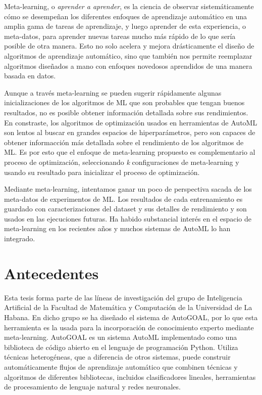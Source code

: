 Meta-learning, o \textit{aprender a aprender}, es la ciencia de observar sistemáticamente cómo se desempeñan los diferentes enfoques de aprendizaje automático en una amplia gama de tareas de aprendizaje, y luego aprender de esta experiencia, o meta-datos, para aprender nuevas tareas mucho más rápido de lo que sería posible de otra manera. Esto no solo acelera y mejora drásticamente el diseño de algoritmos de aprendizaje automático, sino que también nos permite reemplazar algoritmos diseñados a mano con enfoques novedosos aprendidos de una manera basada en datos.

Aunque a través meta-learning se pueden sugerir rápidamente algunas inicializaciones de los algoritmos de ML que son probables que tengan buenos resultados, no es posible obtener información detallada sobre sus rendimientos. En constraste, los algoritmos de optimización usados en herramientas de AutoML son lentos al buscar en grandes espacios de hiperparámetros, pero son capaces de obtener informacción más detallada sobre el rendimiento de los algoritmos de ML. Es por esto que el enfoque de meta-learning propuesto es complementario al proceso de optimización, seleccionando \textit{k} configuraciones de meta-learning y usando su resultado para inicializar el proceso de optimización.

Mediante meta-learning, intentamos ganar un poco de perspectiva sacada de los meta-datos de experimentos de ML. Los resultados de cada entrenamiento es guardado con caracterizaciones del dataset y sus detalles de rendimiento y son usados en las ejecuciones futuras. Ha habido substancial interés en el espacio de meta-learning en los recientes años y muchos sistemas de AutoML lo han integrado.

\section*{Antecedentes}

Esta tesis forma parte de las líneas de investigación del grupo de Inteligencia Artificial de la Facultad de Matemática y Computación de la Universidad de La Habana. En dicho grupo se ha diseñado el sistema de AutoGOAL,  por lo que esta herramienta es la usada para la incorporación de conocimiento experto mediante meta-learning. AutoGOAL es un sistema AutoML implementado como una biblioteca de código abierto en el lenguaje de programación Python. Utiliza técnicas heterogéneas, que a diferencia de otros sistemas, puede construir automáticamente flujos de aprendizaje automático que combinen técnicas y algoritmos de diferentes bibliotecas, incluidos clasificadores lineales, herramientas de procesamiento de lenguaje natural y redes neuronales.

